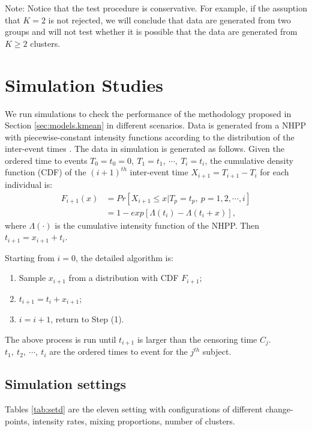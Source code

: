 \documentclass[12pt]{article}
\begin{document}
Note:
  Notice that the test procedure is conservative. For example, if the assuption that $K=2$ is not rejected, we will conclude that data are generated from two groups and will not test whether it is possible that the data are generated from $K \geq 2$ clusters.







\section{Simulation Studies}\label{sec:simulation}
We run simulations to check the performance of the methodology proposed in Section \ref{sec:models.kmean} in different scenarios. Data is generated from a NHPP with piecewise-constant intensity functions according to the distribution of the inter-event times \citep{Klein1984}. The data in simulation is generated as follows. Given the ordered time to events $T_0=t_0=0, ~T_1=t_1, ~\cdots, ~T_{i}=t_{i}$, the cumulative density function (CDF) of the $(i+1)^{th}$ inter-event time $X_{i+1}=T_{i+1}-T_{i}$ for each individual is: 
\begin{equation}\label{eqn:Ft}
\begin{aligned}
 F_{i+1}(x)&=Pr\left[ X_{i+1}\leq x|T_p=t_p,~p=1,2, \cdots, i\right] \\
&=1-exp\left[ \varLambda(t_{i})-\varLambda(t_{i}+x)\right],
\end{aligned}
\end{equation}
where  $\varLambda(\cdot)$ is the cumulative intensity function of the NHPP. Then $t_{i+1}=x_{i+1}+t_i$. 

Starting from $i=0$, the detailed algorithm is: 
\begin{enumerate}[Step 1:]
  \item Sample $x_{i+1}$ from a distribution with CDF $F_{i+1}$;
  \item $t_{i+1}=t_{i}+x_{i+1}$;
  \item $i=i+1$, return to Step (1).
\end{enumerate} 
The above process is run until $t_{i+1}$ is larger than the censoring time $C_j$. $t_1, ~t_2,~ \cdots, ~t_i$ are the ordered times to event for the $j^{th}$ subject. 

\subsection{Simulation settings}
Tables \ref{tab:setd} are the eleven setting with configurations of different change-points, intensity rates, mixing proportions, number of clusters.
\end{document}
